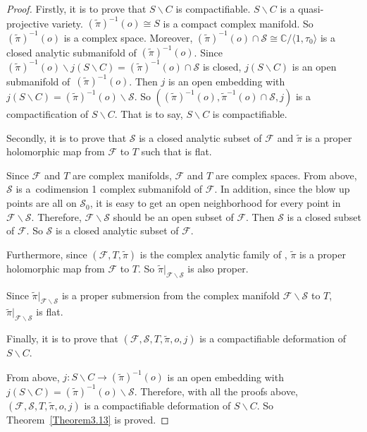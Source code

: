 \documentclass[10pt,a4paper]{amsart}
\numberwithin{equation}{section}
\def\operatorname#1{#1}
\def\overline#1{#1}
\begin{document}
\begin{proof}
Firstly, it is to prove that $S\backslash C$ is compactifiable.
$S\backslash C$ is a quasi-projective variety. $(\widetilde{\pi})^{-1}(o)\cong S$ is a compact complex manifold. So $(\widetilde{\pi})^{-1}(o)$ is a complex space. Moreover, $(\widetilde{\pi})^{-1}(o)\cap \mathcal{S}\cong \mathbb{C}/\langle 1, \tau_0 \rangle$ is a closed analytic submanifold of $(\widetilde{\pi})^{-1}(o)$. Since $(\widetilde{\pi})^{-1}(o)\backslash j(S\backslash C)=(\widetilde{\pi})^{-1}(o)\cap \mathcal{S}$ is closed, $j(S\backslash C)$ is an open submanifold of~$(\widetilde{\pi})^{-1}(o)$. Then $j$ is an open embedding with $j(S\backslash C)=(\widetilde{\pi})^{-1}(o)\backslash \mathcal{S}$. So $((\widetilde{\pi})^{-1}(o),\widetilde{\pi}^{-1}(o)\cap \mathcal{S},j)$ is a compactification of $S\backslash C$. That is to say, $S\backslash C$ is compactifiable.

Secondly, it is to prove that $\mathcal{S}$ is a closed analytic subset of $\mathcal{F}$ and $\widetilde{\pi}$ is a proper holomorphic map from $\mathcal{F}$ to $T$ such that  is flat.

Since $\mathcal{F}$ and $T$ are complex manifolds, $\mathcal{F}$ and $T$ are complex spaces. From above, $\mathcal{S}$ is a~codimension 1 complex submanifold of $\mathcal{F}$. In addition, since the blow up points are all on $\mathcal{S}_0$, it is easy to get an open neighborhood for every point in $\mathcal{F}\backslash \mathcal{S}$. Therefore, $\mathcal{F}\backslash \mathcal{S}$ should be an open subset of $\mathcal{F}$. Then $\mathcal{S}$ is a closed subset of $\mathcal{F}$. So $\mathcal{S}$ is a closed analytic subset of $\mathcal{F}$.

Furthermore, since $(\mathcal{F},T,\widetilde{\pi})$ is the complex analytic family of \smash{$\operatorname{CP}^2 \#9\overline{\operatorname{CP}}^2$}, $\widetilde{\pi}$ is a proper holomorphic map from $\mathcal{F}$ to $T$. So $\widetilde{\pi}|_{\mathcal{F}\backslash \mathcal{S}}$ is also proper.

Since $\widetilde{\pi}|_{\mathcal{F}\backslash \mathcal{S}}$ is a proper submersion from the complex manifold $\mathcal{F}\backslash \mathcal{S}$ to $T$, $\widetilde{\pi}|_{\mathcal{F}\backslash \mathcal{S}}$ is flat.

Finally, it is to prove that $(\mathcal{F},\mathcal{S},T,\widetilde{\pi},o,j)$ is a compactifiable deformation of $S\backslash C$.

From above, $j\colon S\backslash C \rightarrow (\widetilde{\pi})^{-1}(o)$ is an open embedding with $j(S\backslash C)=(\widetilde{\pi})^{-1}(o)\backslash \mathcal{S}$. Therefore, with all the proofs above, $(\mathcal{F},\mathcal{S},T,\widetilde{\pi},o,j)$ is a compactifiable deformation of $S\backslash C$. So Theorem~\ref{Theorem3.13} is proved.
\end{proof}
\end{document}
